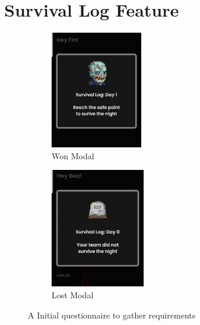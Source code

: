 \documentclass{l4proj}
\begin{document}
\section{Survival Log Feature}
\begin{figure}
\centering
\begin{subfigure}{.50\textwidth}
  \centering
  \includegraphics[width=40mm]{dissertation/images/15.jpg}
  \caption{Won Modal}
  \label{fig:sub1}
\end{subfigure}%
\begin{subfigure}{.5\textwidth}
  \centering
  \includegraphics[width=41mm]{dissertation/images/16.jpg}
  \caption{Lost Modal}
  \label{fig:sub2}
\end{subfigure}
\caption{A Initial questionnaire to gather requirements}
\label{fig:test}
\end{figure}
\end{document}

